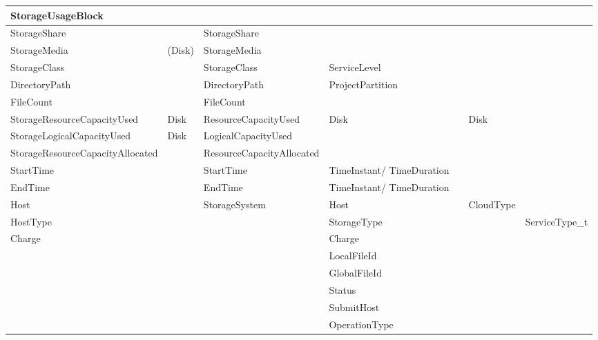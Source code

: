 \begin{longtable}{ | p{} | p{} | p{} | p{} | p{} | p{} | p{} | }



\textbf{Storage\-Usage\-Block}& 		& 			&			& 			& 						& \\ \hline
StorageShare		& 			& StorageShare		&			& 			& 						& \\ \hline
StorageMedia		& (Disk)		& StorageMedia		&			& 			& 						& \\ \hline
StorageClass		& 			& StorageClass		& Service\-Level	& 			& 						& \\ \hline
Directory\-Path		& 			& Directory\-Path	& Project\-Partition	& 			& 						& \\ \hline
FileCount		& 			& FileCount		& 			& 			& 						& \\ \hline
Storage\-Resource\-Capacity\-Used& Disk		& Resource\-Capacity\-Used& Disk		&			& Disk						& \\ \hline
Storage\-Logical\-Capacity\-Used& Disk		& Logical\-Capacity\-Used&			& 			& 						& \\ \hline
Storage\-Resource\-Capacity\-Allocated& 	& Resource\-Capacity\-Allocated&		& 			& 						& \\ \hline
StartTime		& 			& StartTime		& Time\-Instant/ Time\-Duration& 		& 						& \\ \hline
EndTime			& 			& EndTime		& Time\-Instant/ Time\-Duration& 		& 						& \\ \hline
Host			& 			& Storage\-System	& Host			& 			& CloudType					& \\ \hline
HostType		& 			& 			& Storage\-Type		& 			& 						& ServiceType\_t\\ \hline
Charge			& 			& 			& Charge		& 			& 						& \\ \hline
			& 			& 			& Local\-File\-Id	& 			& 					& \\ \hline
			& 			& 			& Global\-File\-Id	& 			& 					& \\ \hline
			& 			& 			& Status		& 			& 					& \\ \hline
			& 			& 			& Submit\-Host		& 			& 					& \\ \hline
			& 			& 			& Operation\-Type	& 			& 					& \\ \hline\hline






\end{longtable}

